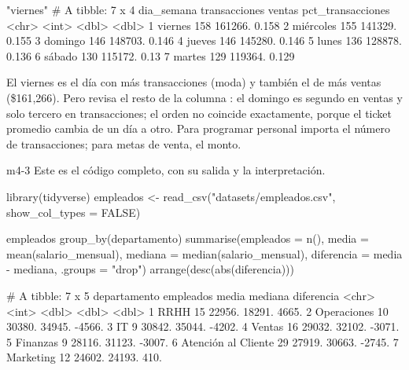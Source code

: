 \begin{rsalida}
[1] "viernes"
# A tibble: 7 x 4
  dia_semana transacciones  ventas pct_transacciones
  <chr>              <int>   <dbl>             <dbl>
1 viernes              158 161266.             0.158
2 miércoles            155 141329.             0.155
3 domingo              146 148703.             0.146
4 jueves               146 145280.             0.146
5 lunes                136 128878.             0.136
6 sábado               130 115172.             0.13
7 martes               129 119364.             0.129
\end{rsalida}

El viernes es el día con más transacciones (moda) y también el de más
ventas (\$161,266). Pero revisa el resto de la columna : el
domingo es segundo en ventas y solo tercero en transacciones; el orden no
coincide exactamente, porque el ticket promedio cambia de un día a
otro. Para programar personal importa el número de transacciones; para
metas de venta, el monto.


\begin{solucion}{m4-3}
Este es el código completo, con su salida y la interpretación.
\end{solucion}

\begin{rcode}
library(tidyverse)
empleados <- read_csv("datasets/empleados.csv", show_col_types = FALSE)
\end{rcode}

\begin{rcode}
empleados %
  group_by(departamento) %
  summarise(empleados  = n(),
            media      = mean(salario_mensual),
            mediana    = median(salario_mensual),
            diferencia = media - mediana,
            .groups = "drop") %
  arrange(desc(abs(diferencia)))
\end{rcode}
\begin{rsalida}
# A tibble: 7 x 5
  departamento        empleados  media mediana diferencia
  <chr>                   <int>  <dbl>   <dbl>      <dbl>
1 RRHH                       15 22956.  18291.      4665.
2 Operaciones                10 30380.  34945.     -4566.
3 IT                          9 30842.  35044.     -4202.
4 Ventas                     16 29032.  32102.     -3071.
5 Finanzas                    9 28116.  31123.     -3007.
6 Atención al Cliente        29 27919.  30663.     -2745.
7 Marketing                  12 24602.  24193.       410.
\end{rsalida}

